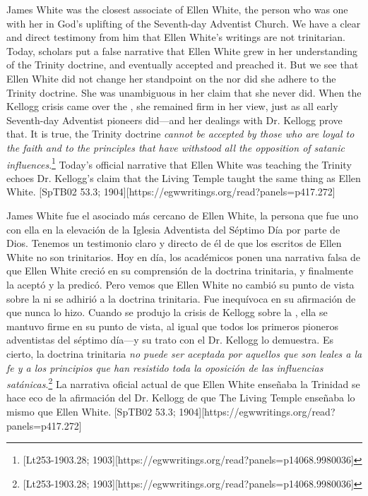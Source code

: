 James White was the closest associate of Ellen White, the person who was one with her in God’s uplifting of the Seventh-day Adventist Church. We have a clear and direct testimony from him that Ellen White’s writings are not trinitarian. Today, scholars put a false narrative that Ellen White grew in her understanding of the Trinity doctrine, and eventually accepted and preached it. But we see that Ellen White did not change her standpoint on the  nor did she adhere to the Trinity doctrine. She was unambiguous in her claim that she never did. When the Kellogg crisis came over the , she remained firm in her view, just as all early Seventh-day Adventist pioneers did—and her dealings with Dr. Kellogg prove that. It is true, the Trinity doctrine \textit{cannot be accepted by those who are loyal to the faith and to the principles that have withstood all the opposition of satanic influences}.\footnote{[Lt253-1903.28; 1903][https://egwwritings.org/read?panels=p14068.9980036]} Today’s official narrative that Ellen White was teaching the Trinity echoes Dr. Kellogg’s claim that the Living Temple taught the same thing as Ellen White. [SpTB02 53.3; 1904][https://egwwritings.org/read?panels=p417.272]


James White fue el asociado más cercano de Ellen White, la persona que fue uno con ella en la elevación de la Iglesia Adventista del Séptimo Día por parte de Dios. Tenemos un testimonio claro y directo de él de que los escritos de Ellen White no son trinitarios. Hoy en día, los académicos ponen una narrativa falsa de que Ellen White creció en su comprensión de la doctrina trinitaria, y finalmente la aceptó y la predicó. Pero vemos que Ellen White no cambió su punto de vista sobre la  ni se adhirió a la doctrina trinitaria. Fue inequívoca en su afirmación de que nunca lo hizo. Cuando se produjo la crisis de Kellogg sobre la , ella se mantuvo firme en su punto de vista, al igual que todos los primeros pioneros adventistas del séptimo día—y su trato con el Dr. Kellogg lo demuestra. Es cierto, la doctrina trinitaria \textit{no puede ser aceptada por aquellos que son leales a la fe y a los principios que han resistido toda la oposición de las influencias satánicas}.\footnote{[Lt253-1903.28; 1903][https://egwwritings.org/read?panels=p14068.9980036]} La narrativa oficial actual de que Ellen White enseñaba la Trinidad se hace eco de la afirmación del Dr. Kellogg de que The Living Temple enseñaba lo mismo que Ellen White. [SpTB02 53.3; 1904][https://egwwritings.org/read?panels=p417.272]






